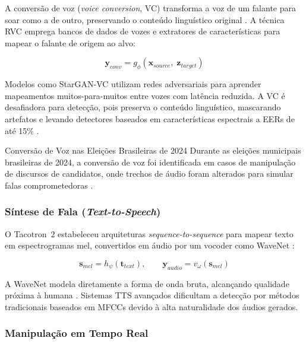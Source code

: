 \documentclass[12pt,a4paper]{article}
\begin{document}
A convers\~{a}o de voz (\textit{voice conversion}, VC) transforma a voz de um
falante para soar como a de outro, preservando o conte\'{u}do lingu\'{i}stico
original \cite{bird2023realtime}.
A t\'{e}cnica RVC emprega bancos de dados de vozes e extratores de
caracter\'{i}sticas para mapear o falante de origem ao alvo:

\begin{equation}
\mathbf{y}_{conv} = g_{\phi}(\mathbf{x}_{source},\; \mathbf{z}_{target})
\end{equation}

Modelos como StarGAN-VC \cite{kameoka2018stargan} utilizam redes adversariais
para aprender mapeamentos muitos-para-muitos entre vozes com lat\^{e}ncia
reduzida.
A VC \'{e} desafiadora para detec\c{c}\~{a}o, pois preserva o conte\'{u}do
lingu\'{i}stico, mascarando artefatos e levando detectores baseados em
caracter\'{i}sticas espectrais a EERs de at\'{e} 15\%
\cite{wang2024asvspoof5}.

\begin{infobox}{Convers\~{a}o de Voz nas Elei\c{c}\~{o}es Brasileiras de 2024}
Durante as elei\c{c}\~{o}es municipais brasileiras de 2024, a convers\~{a}o de
voz foi identificada em casos de manipula\c{c}\~{a}o de discursos de
candidatos, onde trechos de \'{a}udio foram alterados para simular falas
comprometedoras \cite{farrugia2024}.
\end{infobox}

\subsubsection{S\'{i}ntese de Fala (\textit{Text-to-Speech})}

O Tacotron~2 \cite{shen2018natural} estabeleceu arquiteturas
\textit{sequence-to-sequence} para mapear texto em espectrogramas mel,
convertidos em \'{a}udio por um vocoder como WaveNet \cite{oord2016wavenet}:

\begin{equation}
\mathbf{s}_{mel} = h_{\psi}(\mathbf{t}_{text}), \qquad
\mathbf{y}_{audio} = v_{\omega}(\mathbf{s}_{mel})
\end{equation}

A WaveNet modela diretamente a forma de onda bruta, alcan\c{c}ando qualidade
pr\'{o}xima \`{a} humana \cite{oord2016wavenet}. Sistemas TTS avan\c{c}ados
dificultam a detec\c{c}\~{a}o por m\'{e}todos tradicionais baseados em MFCCs
devido \`{a} alta naturalidade dos \'{a}udios gerados.

\subsubsection{Manipula\c{c}\~{a}o em Tempo Real}
\end{document}
